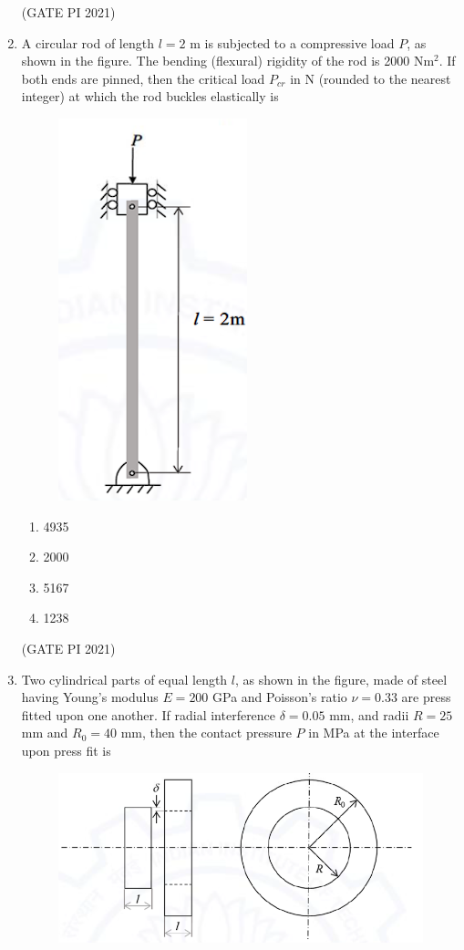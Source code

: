 \documentclass[journal,12pt,onecolumn]{IEEEtran}
\theoremstyle{remark}
\begin{document}
\begin{enumerate}
\hfill (GATE PI 2021)

\item
A circular rod of length $l = 2$ m is subjected to a compressive load $P$, as shown in the figure. The bending (flexural) rigidity of the rod is 2000 Nm$^2$. If both ends are pinned, then the critical load $P_{cr}$ in N (rounded to the nearest integer) at which the rod buckles elastically is

\begin{figure}[H]
    \centering
    \includegraphics[width=0.3\columnwidth]{figs/fig5.png}
    \caption{}
    \label{fig:placeholder}
\end{figure} 

\begin{multicols}{4}
\begin{enumerate}
\item 4935
\item 2000
\item 5167
\item 1238
\end{enumerate}
\end{multicols}

\hfill (GATE PI 2021)

\item
Two cylindrical parts of equal length $l$, as shown in the figure, made of steel having Young's modulus $E = 200$ GPa and Poisson's ratio $\nu = 0.33$ are press fitted upon one another. If radial interference $\delta = 0.05$ mm, and radii $R = 25$ mm and $R_0 = 40$ mm, then the contact pressure $P$ in MPa at the interface upon press fit is

\begin{figure}[H]
    \centering
    \includegraphics[width=0.5\columnwidth]{figs/fig6.png}
    \caption{}
    \label{fig:placeholder}
\end{figure} 


\end{enumerate}
\end{document}
